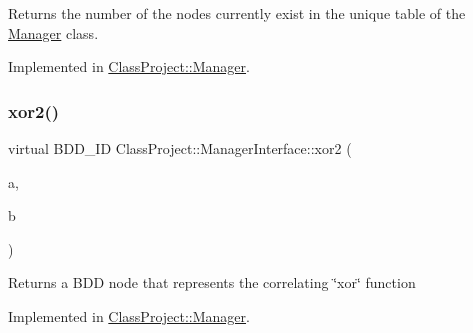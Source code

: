 \begin{DoxyReturn}{Returns}
the number of the nodes currently exist in the unique table of the \hyperlink{classClassProject_1_1Manager}{Manager} class. 
\end{DoxyReturn}


Implemented in \hyperlink{classClassProject_1_1Manager_a82b10a42ec726d42ea4d2e8bc72a3db9}{Class\+Project\+::\+Manager}.

\mbox{\label{classClassProject_1_1ManagerInterface_a2b2c4948ef41ddb1036289cd07dac156}} 
\subsubsection{\texorpdfstring{xor2()}{xor2()}}
{\footnotesize\ttfamily virtual B\+D\+D\+\_\+\+ID Class\+Project\+::\+Manager\+Interface\+::xor2 (\begin{DoxyParamCaption}\item[{const B\+D\+D\+\_\+\+ID}]{a,  }\item[{const B\+D\+D\+\_\+\+ID}]{b }\end{DoxyParamCaption})\hspace{0.3cm}{\ttfamily [pure virtual]}}

\begin{DoxyReturn}{Returns}
a B\+DD node that represents the correlating \char`\"{}xor\char`\"{} function 
\end{DoxyReturn}


Implemented in \hyperlink{classClassProject_1_1Manager_a2582e9a9474189a2710c551548c20c19}{Class\+Project\+::\+Manager}.

